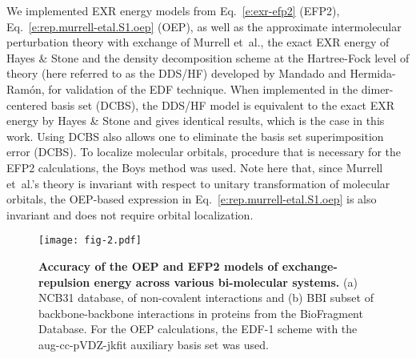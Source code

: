We implemented EXR energy models from Eq.~\eqref{e:exr-efp2}
(EFP2), Eq.~\eqref{e:rep.murrell-etal.S1.oep} (OEP), as well as 
the approximate intermolecular perturbation theory with exchange of 
Murrell et~al.\cite{Murrell.Randic.Williams.Longuet-Higgins.ProcRSocLondA.1965},
the exact EXR energy of Hayes \& Stone\cite{Hayes.Stone.MolPhys.1984}
and the density decomposition scheme 
at the Hartree\hyp{}Fock level of theory (here referred to as the DDS/HF) 
developed by Mandado and Hermida\hyp{}Ram{\'o}n,\cite{Mandado.Hermida-Ramon.JCTC.2011} 
for validation of the EDF technique.
When implemented in the dimer\hyp{}centered basis set\cite{Chalasinski.Gutowski.MolPhys.1985} (DCBS),
the DDS/HF model is
equivalent to the exact EXR energy by Hayes \& Stone and gives identical results,
which is the case in this work. Using DCBS also allows one to eliminate the basis set
superimposition error (DCBS).
To localize molecular orbitals, procedure that is necessary for the EFP2 calculations,
the Boys method\cite{Boys.RevModPhys.1960} was used. Note here that, since
Murrell et~al.'s theory is invariant with respect to unitary transformation
of molecular orbitals, the OEP\hyp{}based expression 
in Eq.~\eqref{e:rep.murrell-etal.S1.oep} is also invariant and does not require
orbital localization. 
%
%
%
\begin{figure*}[t]
\texttt{[image: fig-2.pdf]}
\caption{\label{f:fig-2} {\bf Accuracy of the OEP and EFP2 models of exchange\hyp{}repulsion energy
across various bi\hyp{}molecular systems.} 
(a) NCB31 
database,\cite{Zhao.Schultz.Truhlar.JCTC.2006,
Zhao.Truhlar.JCTC.2005,Zhao.Schultz.Truhlar.JCTC.2006,Zhao.Schultz.Truhlar.JCP.2005} 
of non\hyp{}covalent interactions
and
(b) BBI subset\cite{Burns.Faver.Zheng.Marshall.Smith.Vanommeslaeghe.MacKerell.Merz.Sherrill.JCP.2017} 
of backbone\hyp{}backbone interactions in proteins from the BioFragment Database.
For the OEP calculations, the EDF-1 scheme with the aug-cc-pVDZ-jkfit auxiliary basis set
was used.
} 
\end{figure*}
%

